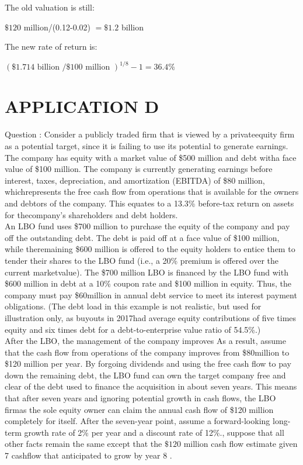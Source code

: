 \documentclass[11pt]{article}
\begin{document}
The old valuation is still:

$\$ 120$ million/(0.12-0.02) $=\$ 1.2$ billion

The new rate of return is:

$(\$ 1.714 \text { billion } / \$ 100 \text { million })^{1 / 8}-1=36.4 \%$

\section*{APPLICATION D}
Question : Consider a publicly traded firm that is viewed by a privateequity firm as a potential target, since it is failing to use its potential to generate earnings. The company has equity with a market value of \$500 million and debt witha face value of \$100 million. The company is currently generating earnings before interest, taxes, depreciation, and amortization (EBITDA) of \$80 million, whichrepresents the free cash flow from operations that is available for the owners and debtors of the company. This equates to a 13.3\% before-tax return on assets for thecompany’s shareholders and debt holders.\\
An LBO fund uses \$700 million to purchase the equity of the company and pay off the outstanding debt. The debt is paid off at a face value of \$100 million, while theremaining \$600 million is offered to the equity holders to entice them to tender their shares to the LBO fund (i.e., a 20\% premium is offered over the current marketvalue). The \$700 million LBO is financed by the LBO fund with \$600 million in debt at a 10\% coupon rate and \$100 million in equity. Thus, the company must pay \$60million in annual debt service to meet its interest payment obligations. (The debt load in this example is not realistic, but used for illustration only, as buyouts in 2017had average equity contributions of five times equity and six times debt for a debt-to-enterprise value ratio of 54.5\%.)\\
After the LBO, the management of the company improves As a result, assume that the cash flow from operations of the company improves from \$80million to \$120 million per year. By forgoing dividends and using the free cash flow to pay down the remaining debt, the LBO fund can own the target company free and clear of the debt used to finance the acquisition in about seven years. This means that after seven years and ignoring potential growth in cash flows, the LBO firmas the sole equity owner can claim the annual cash flow of \$120 million completely for itself. After the seven-year point, assume a forward-looking long-term growth rate of 2\% per year and a discount rate of 12\%., suppose that all other facts remain the same except that the $\$ 120$ million cash flow estimate given 7 cashflow that anticipated to grow by year 8 .
\end{document}
